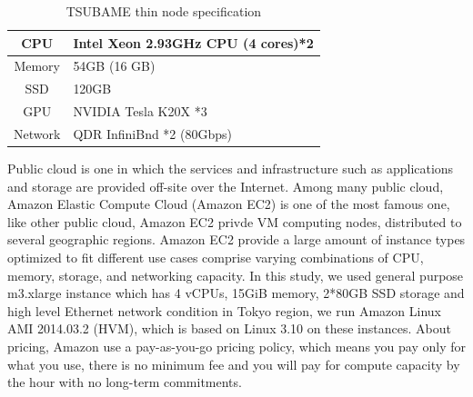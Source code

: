 \begin{table}[h]
\caption{\small TSUBAME thin node specification}
\label{tbl:spec}
\begin{center}
\begin{tabular}{|c|l|}
  \hline
  \cellcolor{lightgray} CPU      & Intel Xeon 2.93GHz CPU (4 cores)*2\\
  \hline
  \cellcolor{lightgray} Memory   & 54GB (16 GB)    \\
  \hline
  \cellcolor{lightgray} SSD      & 120GB \\
  \hline
  \cellcolor{lightgray} GPU	 & NVIDIA Tesla K20X *3\\
  \hline
  \cellcolor{lightgray} Network  & QDR InfiniBnd *2 (80Gbps)\\
  \hline
\end{tabular}
\end{center}
\end{table}

Public cloud is one in which the services and infrastructure such as applications and storage are provided off-site over the Internet.
Among many public cloud, Amazon Elastic Compute Cloud (Amazon EC2) is one of the most famous one, like other public cloud, Amazon EC2 privde VM computing nodes, distributed to several geographic regions.
Amazon EC2 provide a large amount of instance types optimized to fit different use cases comprise varying combinations of CPU, memory, storage, and networking capacity.
In this study, we used general purpose m3.xlarge instance which has 4 vCPUs, 15GiB memory, 2*80GB SSD storage and high level Ethernet network condition in Tokyo region, we run Amazon Linux AMI 2014.03.2 (HVM), which is based on Linux 3.10 on these instances.
About pricing, Amazon use a pay-as-you-go pricing policy, which means you pay only for what you use, there is no minimum fee and you will pay for compute capacity by the hour with no long-term commitments.

